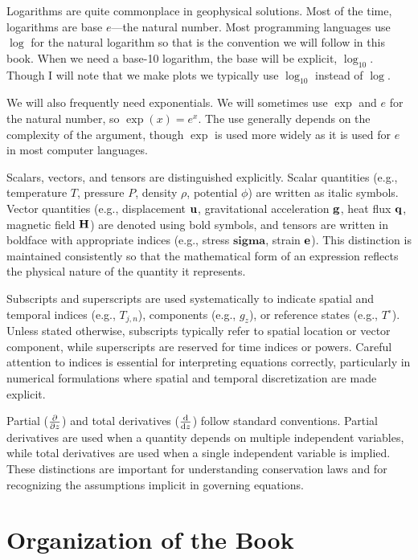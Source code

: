 Logarithms are quite commonplace in geophysical solutions.  Most of the time, logarithms are base $e$---the natural number. Most programming languages use $\log$ for the natural logarithm so that is the convention we will follow in this book.  When we need a base-10 logarithm, the base will be explicit, $\log_{10}$.  Though I will note that we make plots we typically use $\log_{10}$ instead of $\log$.

We will also frequently need exponentials.  We will sometimes use $\exp$ and $e$ for the natural number, so $\exp(x) = e^{x}$.  The use generally depends on the complexity of the argument, though $\exp$ is used more widely as it is used for $e$ in most computer languages.

Scalars, vectors, and tensors are distinguished explicitly. Scalar quantities (e.g., temperature $T$, pressure $P$, density $\rho$, potential $\phi$) are written as italic symbols. Vector quantities (e.g., displacement $\vb{u}$, gravitational acceleration $\vb{g}$, heat flux $\vb{q}$, magnetic field $\vb{H}$) are denoted using bold symbols, and tensors are written in boldface with appropriate indices (e.g., stress $\bm{sigma}$, strain $\vb{e}$). This distinction is maintained consistently so that the mathematical form of an expression reflects the physical nature of the quantity it represents.

Subscripts and superscripts are used systematically to indicate spatial and temporal indices (e.g., $T_{j,n}$), components (e.g., $g_z$), or reference states (e.g., $T^\circ$). Unless stated otherwise, subscripts typically refer to spatial location or vector component, while superscripts are reserved for time indices or powers. Careful attention to indices is essential for interpreting equations correctly, particularly in numerical formulations where spatial and temporal discretization are made explicit.

Partial ($\pdv{}{z}$) and total derivatives ($\dv{}{z}$) follow standard conventions. Partial derivatives are used when a quantity depends on multiple independent variables, while total derivatives are used when a single independent variable is implied. These distinctions are important for understanding conservation laws and for recognizing the assumptions implicit in governing equations.

\section*{Organization of the Book}

